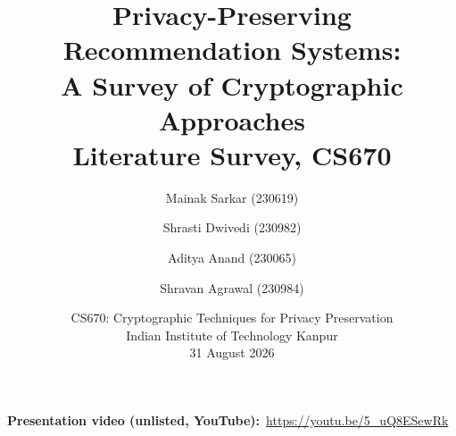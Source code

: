 \documentclass[11pt]{article}
\begin{document}
\title{\bfseries Privacy-Preserving Recommendation Systems:\\
       A Survey of Cryptographic Approaches\\[0.4em]
       \large Literature Survey, CS670}

\author{Mainak Sarkar (230619) \and Shrasti Dwivedi (230982) \and
        Aditya Anand (230065) \and Shravan Agrawal (230984)}

\date{CS670: Cryptographic Techniques for Privacy Preservation\\
      Indian Institute of Technology Kanpur \\
      31 August 2026}

\maketitle

\begin{center}
  \textbf{Presentation video (unlisted, YouTube):}~\url{https://youtu.be/5_uQ8ESewRk}
\end{center}



\tableofcontents
\newpage


% 
% 



\end{document}
